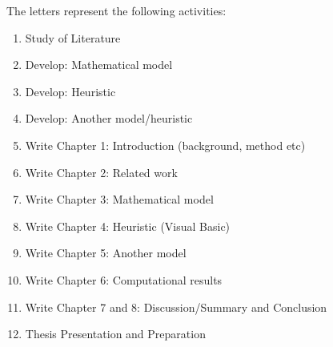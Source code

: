 \documentclass{article}
\begin{document}
The letters represent the following activities:

\begin{enumerate}[label=(\Alph*)]
\item Study of Literature
\item Develop: Mathematical model
\item Develop: Heuristic
\item Develop: Another model/heuristic
\item Write Chapter 1: Introduction (background, method etc)
\item Write Chapter 2: Related work
\item Write Chapter 3: Mathematical model
\item Write Chapter 4: Heuristic (Visual Basic)
\item Write Chapter 5: Another model
\item Write Chapter 6: Computational results
\item Write Chapter 7 and 8: Discussion/Summary and Conclusion
\item Thesis Presentation and Preparation \\
\end{enumerate}
\end{document}
